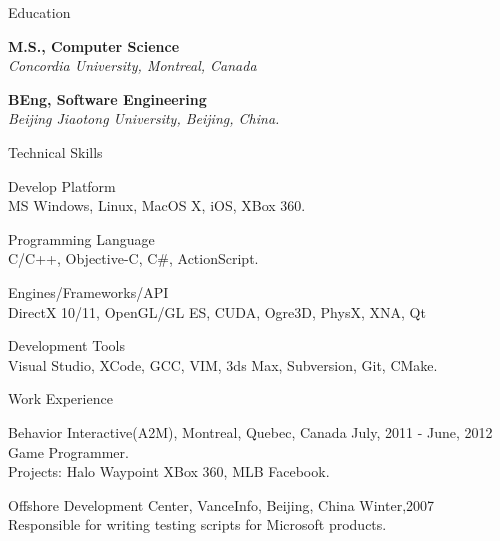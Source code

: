 \documentclass[10pt]{article}
\newenvironment{mydescription}{%
    \begin{description}
        \setlength{\itemsep}{0.25em}%
        \setlength{\parsep}{0em}%
        \setlength{\topsep}{\itemsep}%
        \setlength{\parskip}{0em}%
        \setlength{\labelwidth}{0.1em}
        \setlength{\labelsep}{0em} 
    }%
{\end{description}}
\begin{document}
\begin{cv}
\begin{cvlist}{Education}
    \item   \textbf{M.S., Computer Science}  \\ 
            \emph{Concordia University, Montreal, Canada}
    \item   \textbf{BEng, Software Engineering} \\
            \emph{Beijing Jiaotong University, Beijing, China.}
\end{cvlist}

\begin{cvlist}{Technical Skills}
\item
    \begin{mydescription} 
        \item[Develop Platform] \hfill \\
            MS Windows, Linux, MacOS X, iOS, XBox 360.
        \item[Programming Language] \hfill \\
            C/C++, Objective-C, C\#, ActionScript.  
        \item [Engines/Frameworks/API] \hfill \\
             DirectX 10/11, OpenGL/GL ES, CUDA, Ogre3D, PhysX, XNA, Qt
        \item[Development Tools] \hfill \\
            Visual Studio, XCode, GCC, VIM, 3ds Max, Subversion, Git, CMake.
    \end{mydescription} 
\end{cvlist} 




\begin{cvlist}{Work Experience}
\item 
    \begin{mydescription}
		\item[Behavior Interactive(A2M), Montreal, Quebec, Canada] \hfill July, 2011 - June, 2012 \\ 
			Game Programmer. \\ 
			Projects: Halo Waypoint XBox 360, MLB Facebook. 
        	\item[Offshore Development Center, VanceInfo, Beijing, China] \hfill Winter,2007 \\ 
            Responsible for writing testing scripts for Microsoft products. 
    \end{mydescription}
\end{cvlist}


\end{cv}
\end{document}
